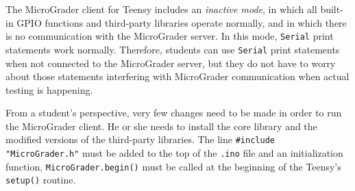 \documentclass[12pt]{article}
\begin{document}
\begin{appendices}
The MicroGrader client for Teensy includes an \textit{inactive mode}, in which all built-in GPIO functions and third-party libraries operate normally, and in which there is no communication with the MicroGrader server.  In this mode, \texttt{Serial} print statements work normally.  Therefore, students can use \texttt{Serial} print statements when not connected to the MicroGrader server, but they do not have to worry about those statements interfering with MicroGrader communication when actual testing is happening.

From a student's perspective, very few changes need to be made in order to run the MicroGrader client.  He or she needs to install the core library and the modified versions of the third-party libraries.  The line \verb+#include "MicroGrader.h"+ must be added to the top of the \texttt{.ino} file and an initialization function, \texttt{MicroGrader.begin()} must be called at the beginning of the Teensy's \texttt{setup()} routine.

\end{appendices}
\end{document}
